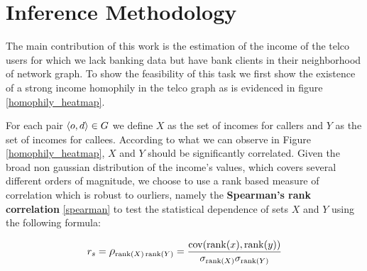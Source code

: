 \section{Inference Methodology}






The main contribution of this work is the estimation of the income of the telco users for which we lack banking data but have bank clients in their neighborhood of network graph. To show the feasibility of this task we first show the existence of a strong income homophily in the telco graph as is evidenced in figure \ref{homophily_heatmap}.

For each pair \( \left< o, d \right> \in \mathlarger{G} \) we define \( X \) as the set of incomes for callers and \( Y \) as the set of incomes for callees. According to what we can observe in Figure \ref{homophily_heatmap}, \( X \) and \( Y \) should be significantly correlated. Given the broad non gaussian distribution of the income's values, which covers several different  orders of magnitude, we choose to use a rank based measure of correlation which is robust to ourliers, namely the \textbf{Spearman's rank correlation} \eqref{spearman} to test the statistical dependence of sets \( X \) and \( Y \) using the following formula:

\begin{equation}
r_s = \mathlarger{\rho}_{\operatorname{rank}(X) \operatorname{rank}(Y)} = \frac{\operatorname{cov}(\operatorname{rank}(x), \operatorname{rank}(y))}{\sigma_{\operatorname{rank}(X)} \sigma_{\operatorname{rank}(Y)}}
\label{spearman}
\end{equation}

